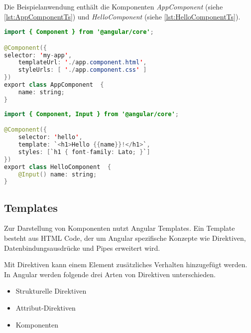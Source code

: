 
Die Beispielanwendung enthält die Komponenten \textit{AppComponent} (siehe \autoref{lst:AppComponentTs}) und \textit{HelloComponent} (siehe \autoref{lst:HelloComponentTs}).

\begin{lstlisting}[caption=Die Komponente AppComponent in der Datei app.component.ts, label=lst:AppComponentTs, language=Java]
import { Component } from '@angular/core';

@Component({
selector: 'my-app',
	templateUrl: './app.component.html',
	styleUrls: [ './app.component.css' ]
})
export class AppComponent  {
	name: string;
}
\end{lstlisting}

\begin{lstlisting}[caption=Die Komponente HelloComponent in der Datei hello.component.ts, label=lst:HelloComponentTs, language=Java]
import { Component, Input } from '@angular/core';

@Component({
	selector: 'hello',
	template: `<h1>Hello {{name}}!</h1>`,
	styles: [`h1 { font-family: Lato; }`]
})
export class HelloComponent  {
	@Input() name: string;
}
\end{lstlisting}

\subsection{Templates}
Zur Darstellung von Komponenten nutzt Angular Templates. Ein Template besteht aus HTML Code, der um Angular spezifische Konzepte wie Direktiven, Datenbindungsausdrücke und Pipes erweitert wird. \autocites[vgl.][]{Google.b}[vgl.][52]{Steyer.2017} 

Mit Direktiven kann einem Element zusätzliches Verhalten hinzugefügt werden. \autocites[vgl.][265]{Steyer.2017}[vgl.][401]{Freeman.2018} In Angular werden folgende drei Arten von Direktiven unterschieden. \autocite[vgl.][]{Google.}

\begin{itemize}
	\item Strukturelle Direktiven 
	\item Attribut-Direktiven
	\item Komponenten
\end{itemize}

